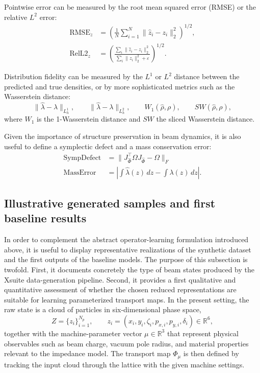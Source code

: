 \documentclass[11pt,a4paper]{article}
\begin{document}
\begin{sloppypar}
Pointwise error can be measured by the root mean squared error (RMSE) or the relative $L^2$ error:
\begin{align}
 \mathrm{RMSE}_z
 &=
 \left(
 \frac{1}{N}
 \sum_{i=1}^{N}
 \|\widehat{z}_i-z_i\|_2^2
 \right)^{1/2}, \\
 \mathrm{RelL2}_z
 &=
 \left(
 \frac{\sum_i \|\widehat{z}_i-z_i\|_2^2}{\sum_i \|z_i\|_2^2 + \varepsilon}
 \right)^{1/2}.
\end{align}

Distribution fidelity can be measured by the $L^1$ or $L^2$ distance between the predicted and true densities, or by more sophisticated metrics such as the Wasserstein distance:
\begin{equation}
 \|\widehat{\lambda}-\lambda\|_{L^1_h},
 \qquad
 \|\widehat{\lambda}-\lambda\|_{L^2_h},
 \qquad
 W_1(\widehat{\rho},\rho),
 \qquad
 SW(\widehat{\rho},\rho),
 \label{eq:distribution-kpis}
\end{equation}
where $W_1$ is the 1-Wasserstein distance and $SW$ the sliced Wasserstein distance.


Given the importance of structure preservation in beam dynamics, it is also useful to define a symplectic defect and a mass conservation error:
\begin{equation}
    \begin{split}
         \mathrm{SympDefect} &= \|J_{\widehat{\Phi}}^\top\Omega J_{\widehat{\Phi}} - \Omega\|_F \\
 \mathrm{MassError} &= \left|\int \widehat{\lambda}(z)\,dz - \int \lambda(z)\,dz\right|.
    \end{split}
 \label{eq:structure-kpis}
\end{equation}


\subsection{Illustrative generated samples and first baseline results}
\label{subsec:generated_data_results}

In order to complement the abstract operator-learning formulation introduced above, it is useful to display representative realizations of the synthetic dataset and the first outputs of the baseline models.
The purpose of this subsection is twofold. First, it documents concretely the type of beam states produced by the Xsuite data-generation pipeline. Second, it provides a first qualitative and quantitative assessment of whether the chosen reduced representations are suitable for learning parameterized transport maps. In the present setting, the raw state is a cloud of particles in six-dimensional phase space,
\begin{equation}
Z = \{z_i\}_{i=1}^{N_p}, \qquad z_i=(x_i,y_i,\zeta_i,p_{x,i},p_{y,i},\delta_i)\in\mathbb{R}^6,
\end{equation}
together with the machine-parameter vector $\mu \in \mathbb{R}^3$ that represent physical observables such as beam charge, vacuum pole radius, and material properties relevant to the impedance model. The transport map $\Phi_\mu$ is then defined by tracking the input cloud through the lattice with the given machine settings.


\end{sloppypar}
\end{document}
